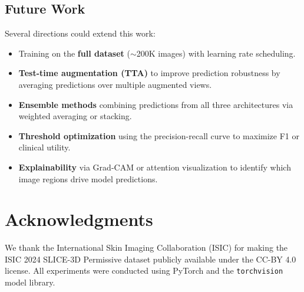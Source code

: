 \documentclass[11pt, a4paper, twocolumn]{article}
\begin{document}
\subsection{Future Work}

Several directions could extend this work:

\begin{itemize}[noitemsep]
    \item Training on the \textbf{full dataset} ($\sim$200K images)
          with learning rate scheduling.
    \item \textbf{Test-time augmentation (TTA)} to improve prediction
          robustness by averaging predictions over multiple augmented
          views.
    \item \textbf{Ensemble methods} combining predictions from all
          three architectures via weighted averaging or stacking.
    \item \textbf{Threshold optimization} using the precision-recall
          curve to maximize F1 or clinical utility.
    \item \textbf{Explainability} via Grad-CAM or attention
          visualization to identify which image regions drive model
          predictions.
\end{itemize}

\section*{Acknowledgments}

We thank the International Skin Imaging Collaboration (ISIC) for
making the ISIC 2024 SLICE-3D Permissive dataset publicly available
under the CC-BY 4.0 license. All experiments were conducted using
PyTorch and the \texttt{torchvision} model library.
\end{document}
